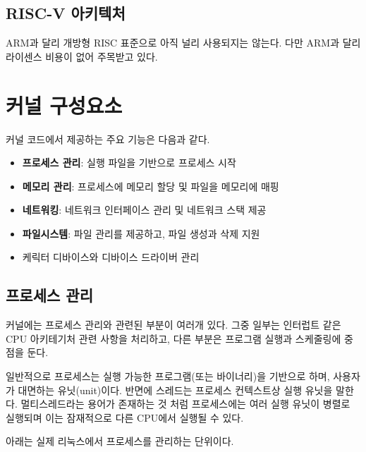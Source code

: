 \subsection{RISC-V 아키텍처}
\begin{flushleft}
    ARM과 달리 개방형 RISC 표준으로 아직 널리 사용되지는 않는다. 
    다만 ARM과 달리 라이센스 비용이 없어 주목받고 있다.
\end{flushleft}


\section{커널 구성요소}
커널 코드에서 제공하는 주요 기능은 다음과 같다.

\begin{itemize}
    \item \textbf{프로세스 관리}: 실행 파일을 기반으로 프로세스 시작
    \item \textbf{메모리 관리}: 프로세스에 메모리 할당 및 파일을 메모리에 매핑
    \item \textbf{네트워킹}: 네트워크 인터페이스 관리 및 네트워크 스택 제공
    \item \textbf{파일시스템}: 파일 관리를 제공하고, 파일 생성과 삭제 지원
    \item 케릭터 디바이스와 디바이스 드라이버 관리
\end{itemize}

\subsection{프로세스 관리}
\begin{flushleft}
    커널에는 프로세스 관리와 관련된 부분이 여러개 있다. 
    그중 일부는 인터럽트 같은 CPU 아키테기처 관련 사항을 처리하고, 
    다른 부분은 프로그램 실행과 스케줄링에 중점을 둔다.
\end{flushleft}

\begin{flushleft}
    일반적으로 프로세스는 실행 가능한 프로그램(또는 바이너리)을 기반으로 하며,
    사용자가 대면하는 유닛(unit)이다. 
    반면에 스레드는 프로세스 컨텍스트상 실행 유닛을 말한다. 
    멀티스레드라는 용어가 존재하는 것 처럼 
    프로세스에는 여러 실행 유닛이 병렬로 실행되며 
    이는 잠재적으로 다른 CPU에서 실행될 수 있다.
\end{flushleft}

\begin{flushleft}
    아래는 실제 리눅스에서 프로세스를 관리하는 단위이다.
\end{flushleft}

